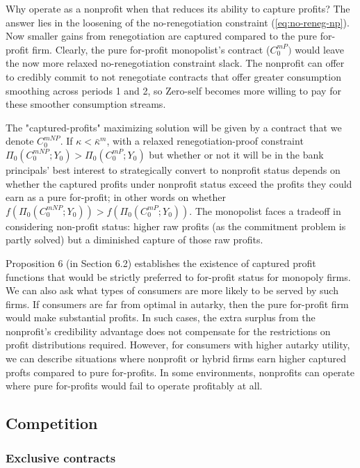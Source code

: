 \documentclass[11pt,english]{article}
\theoremstyle{plain}
\theoremstyle{definition}
\begin{document}
Why operate as a nonprofit
when that reduces its ability to capture profits? The answer lies
in the loosening of the no-renegotiation constraint (\ref{eq:no-reneg-np}).
Now smaller gains from renegotiation are captured compared to the pure for-profit firm. Clearly, the pure for-profit monopolist's contract
($C_{0}^{mP})$ would leave the now more relaxed no-renegotiation constraint slack.
The nonprofit can offer to credibly commit to not renegotiate
contracts that offer greater consumption smoothing across periods
1 and 2, so Zero-self becomes more willing to pay for these smoother consumption
streams.

The "captured-profits" maximizing solution will be given by a contract that we denote $C_{0}^{mNP}$. If $\kappa<\bar{\kappa}^{m}$, with a relaxed
renegotiation-proof constraint $\Pi_{0}(C_{0}^{mNP};Y_{0})>\Pi_{0}(C_{0}^{mP};Y_{0})$
but whether or not it will be in the bank principals' best interest
to strategically convert to nonprofit status depends on whether the
captured profits under nonprofit status exceed the profits they could
earn as a pure for-profit; in other words on whether $f\left(\Pi_{0}(C_{0}^{mNP};Y_{0})\right)>f\left(\Pi_{0}(C_{0}^{mP};Y_{0})\right)$.
The monopolist faces a tradeoff in considering non-profit status:
higher raw profits (as the commitment problem is partly solved) but
a diminished capture of those raw profits.

Proposition 6 (in Section 6.2) establishes the
existence of captured profit functions that would be strictly preferred
to for-profit status for monopoly firms. 
We can also ask what types of
consumers are more likely to be served by such firms. If
consumers are far from optimal in autarky, then the pure for-profit firm
would make substantial profits. In such cases, the extra surplus from the nonprofit's
credibility advantage does not compensate for the  restrictions on profit distributions required.
 However, for consumers with higher autarky utility, we can describe situations where nonprofit or hybrid firms earn higher captured profts compared to pure for-profits. In some environments, nonprofits can operate where pure for-profits would fail to operate profitably at all.

\subsection{Competition}

\subsubsection{Exclusive contracts}
\end{document}
